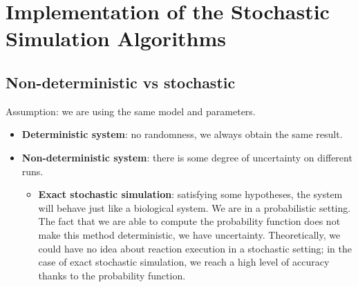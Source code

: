 \graphicspath{{chapters/03/images/}}
\chapter{Implementation of the Stochastic Simulation Algorithms}

\section{Non-deterministic vs stochastic}
Assumption: we are using the same model and parameters.

\begin{itemize}
  \item \textbf{Deterministic system}: no randomness, we always obtain the same result.
  \item \textbf{Non-deterministic system}: there is some degree of uncertainty on different runs.

  \begin{itemize}
    \item \textbf{Exact stochastic simulation}: satisfying some hypotheses, the system will behave just like a biological system.
      We are in a probabilistic setting.
      The fact that we are able to compute the probability function does not make this method deterministic, we have uncertainty.
      Theoretically, we could have no idea about reaction execution in a stochastic setting; in the case of exact stochastic simulation, we reach a high level of accuracy thanks to the probability function.
  \end{itemize}
\end{itemize}


